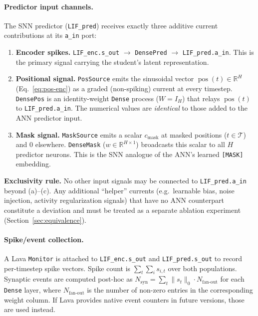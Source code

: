 \documentclass[11pt,a4paper]{article}
\newcommand{\pos}{\operatorname{pos}}      %
\newcommand{\mask}{\operatorname{mask}}    %
\begin{document}
\paragraph{Predictor input channels.}\label{sec:pred-channels}
The SNN predictor (\texttt{LIF\_pred}) receives exactly three additive
current contributions at its \texttt{a\_in} port:
\begin{enumerate}[nosep,label=(\alph*)]
\item \textbf{Encoder spikes.}
  \texttt{LIF\_enc.s\_out} $\to$ \texttt{DensePred} $\to$
  \texttt{LIF\_pred.a\_in}.  This is the primary signal carrying the
  student's latent representation.
\item \textbf{Positional signal.}
  \texttt{PosSource} emits the sinusoidal vector
  $\pos(t) \in \mathbb{R}^H$ (Eq.~\ref{eq:pos-enc}) as a graded
  (non-spiking) current at every timestep.  \texttt{DensePos} is an
  identity-weight \texttt{Dense} process ($W = I_H$) that relays
  $\pos(t)$ to \texttt{LIF\_pred.a\_in}.  The numerical values are
  \emph{identical} to those added to the ANN predictor input.
\item \textbf{Mask signal.}
  \texttt{MaskSource} emits a scalar $c_{\mask}$ at masked positions
  ($t \in \mathcal{T}$) and 0 elsewhere.  \texttt{DenseMask} ($w \in
  \mathbb{R}^{H \times 1}$) broadcasts this scalar to all $H$
  predictor neurons.  This is the SNN analogue of the ANN's learned
  \texttt{[MASK]} embedding.
\end{enumerate}

\noindent\textbf{Exclusivity rule.}  No other input signals may be
connected to \texttt{LIF\_pred.a\_in} beyond (a)--(c).  Any additional
``helper'' currents (e.g.\ learnable bias, noise injection, activity
regularization signals) that have no ANN counterpart constitute a
deviation and must be treated as a separate ablation experiment
(Section~\ref{sec:equivalence}).

\paragraph{Spike/event collection.}
A Lava \texttt{Monitor} is attached to \texttt{LIF\_enc.s\_out} and
\texttt{LIF\_pred.s\_out} to record per-timestep spike vectors.  Spike
count is $\sum_t \sum_i s_{i,t}$ over both populations.  Synaptic events
are computed post-hoc as $N_{\text{syn}} = \sum_t \lVert s_t \rVert_0
\cdot N_{\text{fan-out}}$ for each \texttt{Dense} layer, where
$N_{\text{fan-out}}$ is the number of non-zero entries in the
corresponding weight column.  If Lava provides native event counters in
future versions, those are used instead.
\end{document}
